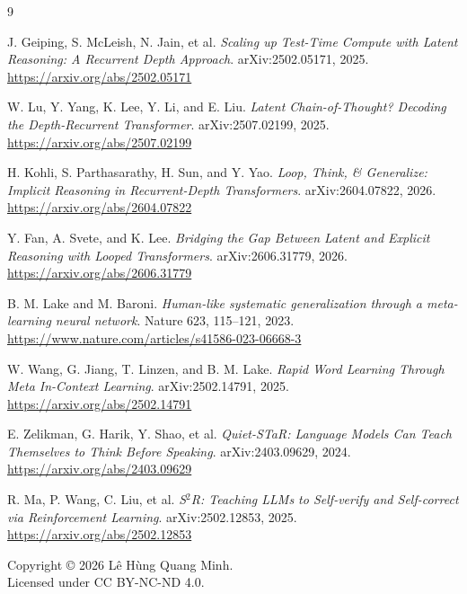 \documentclass[10pt]{article}
\begin{document}
\begin{thebibliography}{9}

J. Geiping, S. McLeish, N. Jain, et al.
\newblock \emph{Scaling up Test-Time Compute with Latent Reasoning: A Recurrent Depth Approach}.
\newblock arXiv:2502.05171, 2025.
\newblock \url{https://arxiv.org/abs/2502.05171}

W. Lu, Y. Yang, K. Lee, Y. Li, and E. Liu.
\newblock \emph{Latent Chain-of-Thought? Decoding the Depth-Recurrent Transformer}.
\newblock arXiv:2507.02199, 2025.
\newblock \url{https://arxiv.org/abs/2507.02199}

H. Kohli, S. Parthasarathy, H. Sun, and Y. Yao.
\newblock \emph{Loop, Think, \& Generalize: Implicit Reasoning in Recurrent-Depth Transformers}.
\newblock arXiv:2604.07822, 2026.
\newblock \url{https://arxiv.org/abs/2604.07822}

Y. Fan, A. Svete, and K. Lee.
\newblock \emph{Bridging the Gap Between Latent and Explicit Reasoning with Looped Transformers}.
\newblock arXiv:2606.31779, 2026.
\newblock \url{https://arxiv.org/abs/2606.31779}

B. M. Lake and M. Baroni.
\newblock \emph{Human-like systematic generalization through a meta-learning neural network}.
\newblock Nature 623, 115--121, 2023.
\newblock \url{https://www.nature.com/articles/s41586-023-06668-3}

W. Wang, G. Jiang, T. Linzen, and B. M. Lake.
\newblock \emph{Rapid Word Learning Through Meta In-Context Learning}.
\newblock arXiv:2502.14791, 2025.
\newblock \url{https://arxiv.org/abs/2502.14791}

E. Zelikman, G. Harik, Y. Shao, et al.
\newblock \emph{Quiet-STaR: Language Models Can Teach Themselves to Think Before Speaking}.
\newblock arXiv:2403.09629, 2024.
\newblock \url{https://arxiv.org/abs/2403.09629}

R. Ma, P. Wang, C. Liu, et al.
\newblock \emph{S$^2$R: Teaching LLMs to Self-verify and Self-correct via Reinforcement Learning}.
\newblock arXiv:2502.12853, 2025.
\newblock \url{https://arxiv.org/abs/2502.12853}

\end{thebibliography}

\vspace{1em}

\begin{center}
\footnotesize
Copyright © 2026 Lê Hùng Quang Minh.\\
Licensed under CC BY-NC-ND 4.0.
\end{center}
\end{document}
